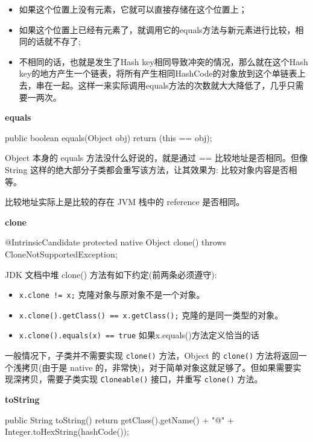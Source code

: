 \begin{itemize}
    \item 如果这个位置上没有元素，它就可以直接存储在这个位置上；
    \item 如果这个位置上已经有元素了，就调用它的equals方法与新元素进行比较，相同的话就不存了;
    \item 不相同的话，也就是发生了Hash key相同导致冲突的情况，那么就在这个Hash key的地方产生一个链表，将所有产生相同HashCode的对象放到这个单链表上去，串在一起。这样一来实际调用equals方法的次数就大大降低了，几乎只需要一两次。 
\end{itemize}

\noindent\textbf{equals}

\begin{Java}
public boolean equals(Object obj) {
    return (this == obj);
}
\end{Java}

Object 本身的 equals 方法没什么好说的，就是通过 == 比较地址是否相同。但像 String 这样的绝大部分子类都会重写该方法，让其效果为: 比较对象内容是否相等。

比较地址实际上是比较的存在 JVM 栈中的 reference 是否相同。

\noindent\textbf{clone}

\begin{Java}
@IntrinsicCandidate
protected native Object clone() throws CloneNotSupportedException;
\end{Java}

JDK 文档中堆 clone() 方法有如下约定(前两条必须遵守):
\begin{itemize}
    \item \texttt{x.clone != x;} 克隆对象与原对象不是一个对象。
    \item \texttt{x.clone().getClass() == x.getClass();} 克隆的是同一类型的对象。
    \item \texttt{x.clone().equals(x) == true} 如果x.equals()方法定义恰当的话
\end{itemize}

一般情况下，子类并不需要实现 \texttt{clone()} 方法，Object 的 \texttt{clone()} 方法将返回一个浅拷贝(由于是 native 的，非常快)，对于简单对象这就足够了。但如果需要实现深拷贝，需要子类实现 \texttt{Cloneable()} 接口，并重写 \texttt{clone()} 方法。

\noindent\textbf{toString}

\begin{Java}
public String toString() {
    return getClass().getName() + "@" + Integer.toHexString(hashCode());
}
\end{Java}

